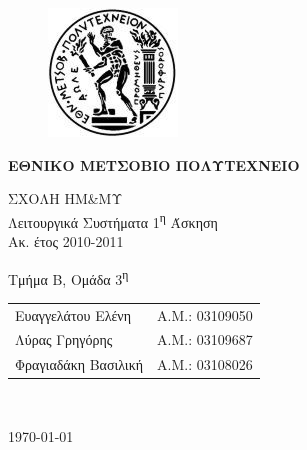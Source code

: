 \begin{titlepage}
\begin{center}
\begin{figure}[t] 
     \includegraphics[scale=0.7]{title/ntua_logo}
\end{figure}
\begin{LARGE}\textbf{ΕΘΝΙΚΟ ΜΕΤΣΟΒΙΟ ΠΟΛΥΤΕΧΝΕΙΟ\\}\end{LARGE}
\vspace{2cm}
\begin{Large}
ΣΧΟΛΗ ΗΜ\&ΜΥ\\
Λειτουργικά Συστήματα
1\textsuperscript{η} Άσκηση\\
Ακ. έτος 2010-2011\\
\end{Large}
\vspace{5cm}
\Large Τμήμα Β, Ομάδα 3\textsuperscript{η}\\
\vspace{1cm}
\begin{tabular}{l r}
\Large{Ευαγγελάτου Ελένη}&
\large{Α.Μ.: 03109050}\\
\Large{Λύρας Γρηγόρης}&
\large{Α.Μ.: 03109687}\\
\Large{Φραγιαδάκη Βασιλική}&
\large{Α.Μ.: 03108026}\\
\end{tabular}\\
\vspace{5cm}

\vfill
\large\today\\
\end{center}
\end{titlepage}

